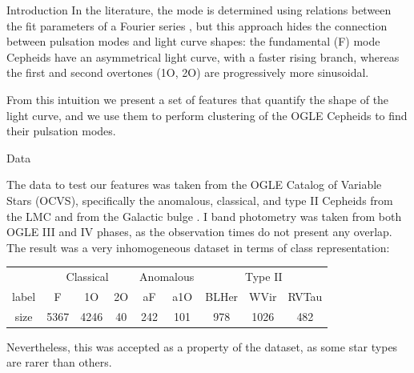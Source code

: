 \documentclass[
    a0paper,
    portrait,
]{baposter}
\begin{document}
\begin{poster}
\begin{posterbox}[name=intro,column=0]{Introduction}
    In the literature, the mode is determined using relations between the fit parameters of a Fourier series \citep{Simon1981,Pietrukowicz2021}, but this approach hides the connection between pulsation modes and light curve shapes: the fundamental (F) mode Cepheids have an asymmetrical light curve, with a faster rising branch, whereas the first and second overtones (1O, 2O) are progressively more sinusoidal.  

    From this intuition we present a set of features that quantify the shape of the light curve, and we use them to perform clustering of the OGLE Cepheids to find their pulsation modes.
\end{posterbox}



\begin{posterbox}[name=data,column=0,below=intro]{Data}

    The data to test our features was taken from the OGLE Catalog of Variable Stars (OCVS), specifically the anomalous, classical, and type II Cepheids from the LMC \citep{OGLE_IV_a_MC,OGLE_IV_cep_MC,OGLE_IV_t2_MC} and from the Galactic bulge \citep{OGLE_IV_all_GAL}. I band photometry was taken from both OGLE III and IV phases, as the observation times do not present any overlap. The result was a very inhomogeneous dataset in terms of class representation:

    \renewcommand{\arraystretch}{1.5}
    \begin{adjustbox}{width=\columnwidth,center}
        \begin{tabular}{c||ccc|cc|ccc}
        & \multicolumn{3}{c}{Classical} & \multicolumn{2}{|c}{Anomalous} & \multicolumn{3}{|c}{Type II} \\ 
    label & F & 1O & 2O & aF & a1O & BLHer & WVir & RVTau \\ \hline
    size  & 5367 & 4246 & 40 & 242 & 101 & 978 & 1026 & 482
        \end{tabular}
    \end{adjustbox}

    Nevertheless, this was accepted as a property of the dataset, as some star types are rarer than others.
\end{posterbox}




\end{poster}
\end{document}
